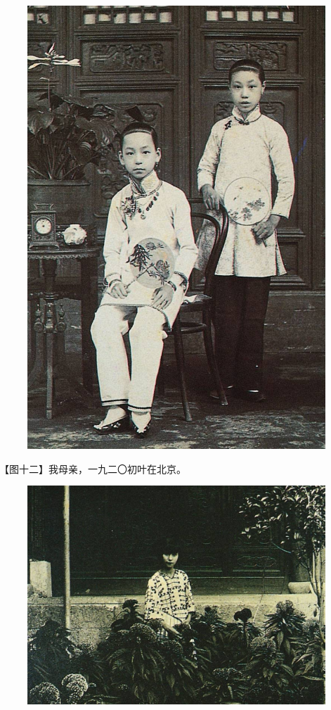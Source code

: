 \begin{figure}[htb]
    \centering %
    \includegraphics[scale=0.4]{picture/对照记11.jpeg}
\end{figure}

\clearpage
\par 【图十二】我母亲，一九二〇初叶在北京。
\begin{figure}[htb]
    \centering %
    \includegraphics[scale=0.4]{picture/对照记12.jpeg}
\end{figure}

